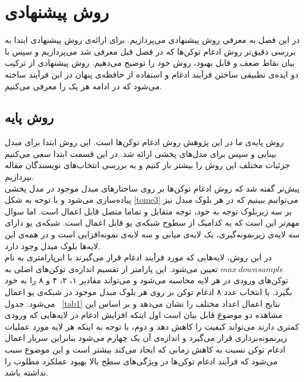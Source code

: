 \chapter{روش پیشنهادی}
در این فصل به معرفی روش پیشنهادی می‌پردازیم. برای ارائه‌ی روش پیشنهادی ابتدا به بررسی دقیق‌تر روش ادغام توکن‌ها که در فصل قبل معرفی شد می‌پردازیم و سپس با بیان نقاط ضعف و قابل بهبود، روش‌ خود را توضیح ‌می‌دهیم. روش پیشنهادی از ترکیب دو ایده‌ی تطبیقی ساختن فرآیند ادغام و استفاده از حافظه‌ی پنهان در این فرآیند ساخته‌ می‌شود که در ادامه هر یک را  معرفی می‌کنیم.

\section{روش پایه}
روش پایه‌ی ما در این پژوهش روش ادغام توکن‌ها \cite{bolya2023token} است. این روش ابتدا برای مبدل بینایی و سپس برای مدل‌های پخشی ارائه شد. در این قسمت ابتدا سعی می‌کنیم جزئیات مختلف این روش را بیشتر باز کنیم و به بررسی انتخاب‌های نویسندگان مقاله بپردازیم.
\\
پیش‌تر گفته شد که روش ادغام توکن‌ها بر روی ساختار‌های مبدل موجود در مدل پخشی پیاده‌سازی می‌شود و با توجه به شکل \ref{tome3} می‌توانیم ببینیم که در هر بلوک مبدل نیز بر سه زیربلوک توجه به خود، توجه متقابل و تماما متصل قابل اعمال است. اما سوال مهم‌تر این است که به کدامیک از سطوح شبکه‌ی یو قابل اعمال است. شبکه‌ی یو دارای سه لایه‌ی زیرنمونه‌گیری، یک لایه‌ی میانی و سه لایه‌ی نمونه‌افزایی است و در همه‌ی این لایه‌ها بلوک مبدل وجود دارد. 
\\
در این روش، لایه‌هایی که مورد فرآیند ادغام قرار می‌گیرند با ابرپارامتری به نام $max\ downsample$ تعیین می‌شود. این پارامتر از تقسیم اندازه‌ی توکن‌های اصلی به توکن‌های ورودی در هر لایه محاسبه می‌شود و می‌تواند مقادیر ۱، ۲، ۴ و ۸ را به خود بگیرد. با انتخاب عدد ۸ ادغام توکن بر روی هر بلوک مبدل موجود در شبکه‌ی یو اعمال می‌شود. جدول  \ref{tab1} نتایج اعمال اعداد مختلف را نشان می‌دهد و بر اساس این مشاهده دو موضوع قابل بیان است اول اینکه افزایش ادغام در لایه‌هایی که ورودی کمتری دارند می‌تواند کیفیت را کاهش دهد و دوم، با توجه به اینکه هر لایه مورد عملیات زیرنمونه‌برداری قرار می‌گیرد و اندازه‌ی آن یک چهارم می‌شود بنابراین سربار اعمال ادغام توکن نسبت به کاهش زمانی که ایجاد می‌کند بیشتر است و این موضوع سبب می‌شود که فرآیند ادغام توکن‌ها در ویژگی‌های سطح بالا بهبود عملکرد مطلوب را نداشته باشد.
\\

